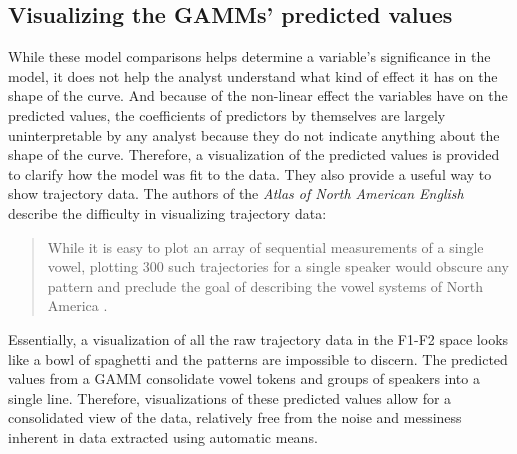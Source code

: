 
\subsection{Visualizing the GAMMs' predicted values}
\label{sec:visualizing_gamms}

While these model comparisons helps determine a variable’s significance in the model, it does not help the analyst understand what kind of effect it has on the shape of the curve. And because of the non-linear effect the variables have on the predicted values, the coefficients of predictors by themselves are largely uninterpretable by any analyst because they do not indicate anything about the shape of the curve. Therefore, a visualization of the predicted values is provided to clarify how the model was fit to the data. They also provide a useful way to show trajectory data. The authors of the \textit{Atlas of North American English} describe the difficulty in visualizing trajectory data:
\begin{quote}
    While it is easy to plot an array of sequential measurements of a single vowel, plotting 300 such trajectories for a single speaker would obscure any pattern and preclude the goal of describing the vowel systems of North America \citep[38]{labov_ash_boberg_2006_anae}.
\end{quote}
Essentially, a visualization of all the raw trajectory data in the F1-F2 space looks like a bowl of spaghetti and the patterns are impossible to discern. The predicted values from a GAMM consolidate vowel tokens and groups of speakers into a single line. Therefore, visualizations of these predicted values allow for a consolidated view of the data, relatively free from the noise and messiness inherent in data extracted using automatic means.

